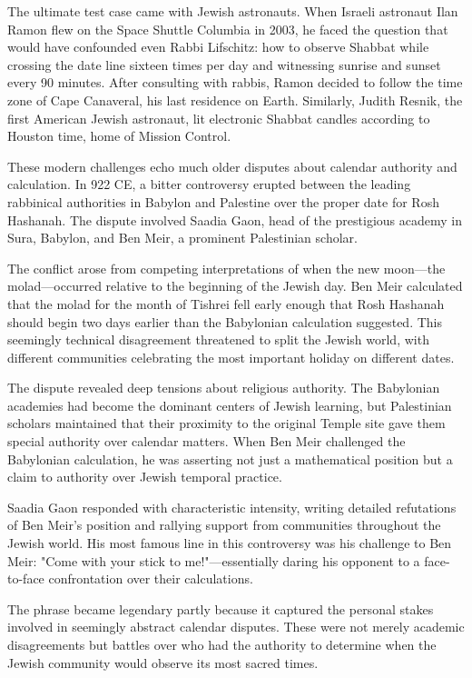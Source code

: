 The ultimate test case came with Jewish astronauts. When Israeli astronaut Ilan Ramon flew on the Space Shuttle Columbia in 2003, he faced the question that would have confounded even Rabbi Lifschitz: how to observe Shabbat while crossing the date line sixteen times per day and witnessing sunrise and sunset every 90 minutes. After consulting with rabbis, Ramon decided to follow the time zone of Cape Canaveral, his last residence on Earth. Similarly, Judith Resnik, the first American Jewish astronaut, lit electronic Shabbat candles according to Houston time, home of Mission Control.

These modern challenges echo much older disputes about calendar authority and calculation. In 922 CE, a bitter controversy erupted between the leading rabbinical authorities in Babylon and Palestine over the proper date for Rosh Hashanah. The dispute involved Saadia Gaon, head of the prestigious academy in Sura, Babylon, and Ben Meir, a prominent Palestinian scholar.

The conflict arose from competing interpretations of when the new moon—the molad—occurred relative to the beginning of the Jewish day. Ben Meir calculated that the molad for the month of Tishrei fell early enough that Rosh Hashanah should begin two days earlier than the Babylonian calculation suggested. This seemingly technical disagreement threatened to split the Jewish world, with different communities celebrating the most important holiday on different dates.

The dispute revealed deep tensions about religious authority. The Babylonian academies had become the dominant centers of Jewish learning, but Palestinian scholars maintained that their proximity to the original Temple site gave them special authority over calendar matters. When Ben Meir challenged the Babylonian calculation, he was asserting not just a mathematical position but a claim to authority over Jewish temporal practice.

Saadia Gaon responded with characteristic intensity, writing detailed refutations of Ben Meir's position and rallying support from communities throughout the Jewish world. His most famous line in this controversy was his challenge to Ben Meir: "Come with your stick to me!"—essentially daring his opponent to a face-to-face confrontation over their calculations.

The phrase became legendary partly because it captured the personal stakes involved in seemingly abstract calendar disputes. These were not merely academic disagreements but battles over who had the authority to determine when the Jewish community would observe its most sacred times.

